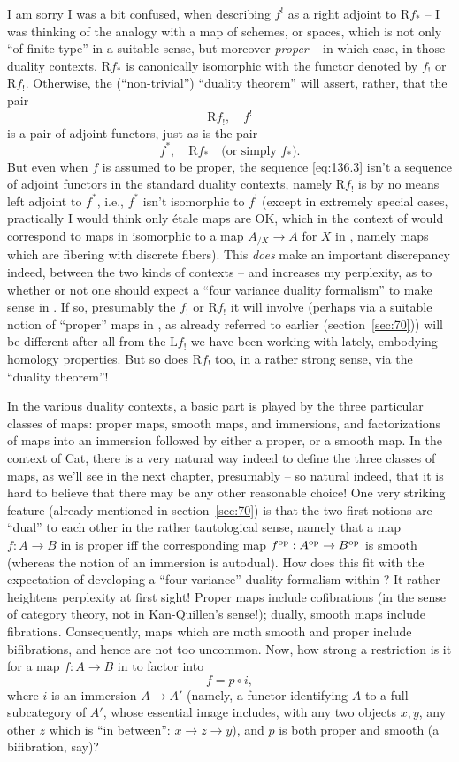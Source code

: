 I am sorry I was a bit confused, when describing $f^!$ as a right
adjoint to $\mathrm Rf_*$ -- I was thinking of the analogy with a map
of schemes, or spaces, which is not only ``of finite type'' in a
suitable sense, but moreover \emph{proper} -- in which case, in those
duality contexts, $\mathrm Rf_*$ is canonically isomorphic with the
functor denoted by $f_!$ or $\mathrm Rf_!$. Otherwise, the
(``non-trivial'') ``duality theorem'' will assert, rather, that the
pair
\[\mathrm Rf_!,\quad f^!\]
is a pair of adjoint functors, just as is the pair
\[f^*,\quad \mathrm Rf_*\quad\text{(or simply $f_*$).}\]
But even when $f$ is assumed to be proper, the sequence
\eqref{eq:136.3} isn't a sequence of adjoint functors in the standard
duality contexts, namely $\mathrm Rf_!$ is by no means left adjoint to
$f^*$, i.e., $f^*$ isn't isomorphic to $f^!$ (except in extremely
special cases, practically I would think only étale maps are OK, which
in the context of \Cat{} would correspond to maps in \Cat{} isomorphic
to a map $A_{/X}\to A$ for $X$ in \Ahat, namely maps which are
fibering with discrete fibers). This \emph{does} make an important
discrepancy indeed, between the two kinds of contexts -- and increases
my perplexity, as to whether or not one should expect a ``four
variance duality formalism'' to make sense in \Cat. If so, presumably
the $f_!$ or $\mathrm Rf_!$ it will involve (perhaps via a suitable
notion of ``proper'' maps in \Cat, as already referred to earlier
(section~\ref{sec:70})) will be different after all from the $\mathrm
Lf_!$ we have been working with lately, embodying homology
properties. But so does $\mathrm Rf_!$ too, in a rather strong sense,
via the ``duality theorem''!

In the various duality contexts, a basic part is played by the three
particular classes of maps: proper maps, smooth maps, and immersions,
and factorizations of maps into an immersion followed by either a
proper, or a smooth map. In the context of Cat, there is a very
natural way indeed to define the three classes of maps, as we'll see
in the next chapter, presumably -- so natural indeed, that it is hard
to believe that there may be any other reasonable choice! One very
striking feature (already mentioned in section~\ref{sec:70}) is that
the two first notions are ``dual'' to each other in the rather
tautological sense, namely that a map $f:A\to B$ in \Cat{} is proper
if{f} the corresponding map $f^{\mathrm{op}}:A^{\mathrm{op}}\to B^{\mathrm{op}}$ is smooth (whereas the
notion of an immersion is autodual). How does this fit
with the expectation of developing a ``four variance'' duality
formalism within \Cat? It rather heightens perplexity at first sight!
Proper maps include cofibrations (in the sense of category theory, not
in Kan-Quillen's sense!); dually, smooth maps include
fibrations. Consequently, maps which are moth smooth and proper
include bifibrations, and hence are not too uncommon. Now, how strong
a restriction is it for a map $f:A\to B$ in \Cat{} to factor into
\[f=p\circ i,\]
where $i$ is an immersion $A\to A'$ (namely, a functor identifying $A$
to a full subcategory of $A'$, whose essential image includes, with
any two objects $x,y$, any other $z$ which is ``in between'': $x\to
z\to y$), and $p$ is both proper and smooth (a bifibration, say)?

